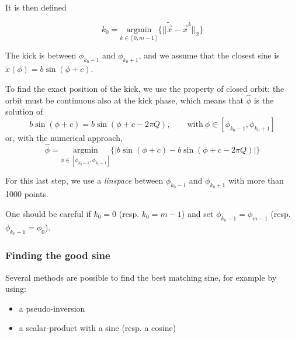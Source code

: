 It is then defined

\begin{equation}
k_0 = \underset{k \in [0, m-1]}{\textrm{argmin}}\{||\tilde{\vec{x}}-\vec{x}^k||_2\}
\end{equation}

The kick is between $\phi_{k_0-1}$ and $\phi_{k_0+1}$, and we assume that the closest sine is $\tilde{x}(\phi) = b \sin(\phi + c) $.

To find the exact position of the kick, we use the property of closed orbit: the orbit must be continuous also at the kick phase, which means that $\hat{\phi}$ is the solution of
\begin{equation}
b \sin(\phi + c) = b\sin(\phi+c-2 \pi Q), \qquad \mathrm{with}~ \phi \in [\phi_{k_0-1}, \phi_{k_0+1}]
\end{equation}
or, with the numerical approach, 
\begin{equation}
\hat{\phi} =  \underset{\phi \in [\phi_{k_0-1}, \phi_{k_0+1}]}{\textrm{argmin}}\{|b \sin(\phi + c) - b\sin(\phi+c-2 \pi Q)|\}
\end{equation}

\remark For this last step, we use a \textit{linspace} between $\phi_{k_0-1}$ and $\phi_{k_0+1}$ with more than 1000 points.

\remark One should be careful if $k_0 = 0$ (resp. $k_0 = m-1$) and set $\phi_{k_0-1} =\phi_{m-1}$ (resp. $\phi_{k_0+1} = \phi_{0}$). 

\subsubsection{Finding the good sine}
Several methods are possible to find the best matching sine, for example by using:
\begin{itemize}
	\item a pseudo-inversion
	\item a scalar-product with a sine (resp. a cosine)
\end{itemize}

